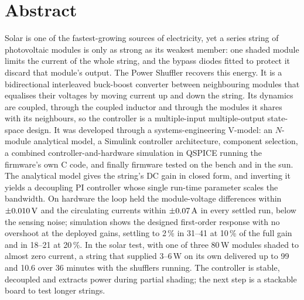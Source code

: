 \section*{Abstract}
\label{sec:abstract}

Solar is one of the fastest-growing sources of electricity, yet a series string of photovoltaic modules is only as strong as its weakest member: one shaded module limits the current of the whole string, and the bypass diodes fitted to protect it discard that module's output. The Power Shuffler recovers this energy. It is a bidirectional interleaved buck-boost converter between neighbouring modules that equalises their voltages by moving current up and down the string. Its dynamics are coupled, through the coupled inductor and through the modules it shares with its neighbours, so the controller is a multiple-input multiple-output state-space design. It was developed through a systems-engineering V-model: an $N$-module analytical model, a Simulink controller architecture, component selection, a combined controller-and-hardware simulation in QSPICE running the firmware's own C code, and finally firmware tested on the bench and in the sun. The analytical model gives the string's DC gain in closed form, and inverting it yields a decoupling PI controller whose single run-time parameter scales the bandwidth. On hardware the loop held the module-voltage differences within $\pm0.010\,\mathrm{V}$ and the circulating currents within $\pm0.07\,\mathrm{A}$ in every settled run, below the sensing noise; simulation shows the designed first-order response with no overshoot at the deployed gains, settling to 2\,\% in 31--41\ms{} at 10\,\% of the full gain and in 18--21\ms{} at 20\,\%. In the solar test, with one of three 80\,W modules shaded to almost zero current, a string that supplied 3--6\,W on its own delivered up to 99\W{} and 10.6\Wh{} over 36 minutes with the shufflers running. The controller is stable, decoupled and extracts power during partial shading; the next step is a stackable board to test longer strings.
